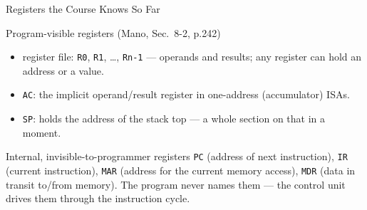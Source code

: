 \documentclass[aspectratio=169]{beamer}
\begin{document}
\begin{frame}{Registers the Course Knows So Far}
  \begin{block}{Program-visible registers (Mano, Sec.~8-2, p.242)}
    \begin{itemize}
      \item {} register file: \texttt{R0}, \texttt{R1},
        \dots, \texttt{Rn-1} --- operands and results; any register can hold an
        address or a value.
      \item {} \texttt{AC}: the implicit operand/result register
        in one-address (accumulator) ISAs.
      \item {} \texttt{SP}: holds the address of the stack top
        --- a whole section on that in a moment.
    \end{itemize}
  \end{block}
  \begin{exampleblock}{Internal, invisible-to-programmer registers}
    \texttt{PC} (address of next instruction), \texttt{IR} (current
    instruction), \texttt{MAR} (address for the current memory access),
    \texttt{MDR} (data in transit to/from memory). The program never names
    them --- the control unit drives them through the instruction cycle.
  \end{exampleblock}
\end{frame}
\end{document}
